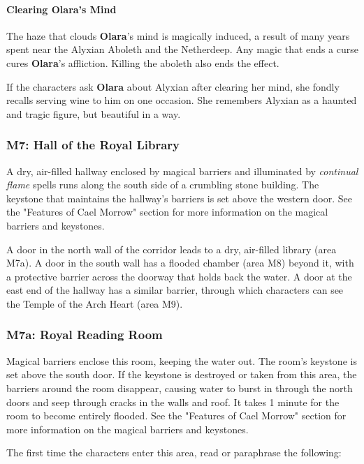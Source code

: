 \documentclass[letterpaper, 11pt, bg=full, twocolumn]{dndbook}
\begin{document}
\paragraph{Clearing Olara's Mind}

The haze that clouds \textbf{Olara}'s mind is magically induced, a result of many years spent near the Alyxian Aboleth and the Netherdeep. Any magic that ends a curse cures \textbf{Olara}'s affliction. Killing the aboleth also ends the effect.

If the characters ask \textbf{Olara} about Alyxian after clearing her mind, she fondly recalls serving wine to him on one occasion. She remembers Alyxian as a haunted and tragic figure, but beautiful in a way.

\subsubsection{M7: Hall of the Royal Library}

A dry, air-filled hallway enclosed by magical barriers and illuminated by \textit{continual flame} spells runs along the south side of a crumbling stone building. The keystone that maintains the hallway's barriers is set above the western door. See the "Features of Cael Morrow" section for more information on the magical barriers and keystones.

A door in the north wall of the corridor leads to a dry, air-filled library (area M7a). A door in the south wall has a flooded chamber (area M8) beyond it, with a protective barrier across the doorway that holds back the water. A door at the east end of the hallway has a similar barrier, through which characters can see the Temple of the Arch Heart (area M9).

\subsubsection{M7a: Royal Reading Room}

Magical barriers enclose this room, keeping the water out. The room's keystone is set above the south door. If the keystone is destroyed or taken from this area, the barriers around the room disappear, causing water to burst in through the north doors and seep through cracks in the walls and roof. It takes 1 minute for the room to become entirely flooded. See the "Features of Cael Morrow" section for more information on the magical barriers and keystones.

The first time the characters enter this area, read or paraphrase the following:
\end{document}
